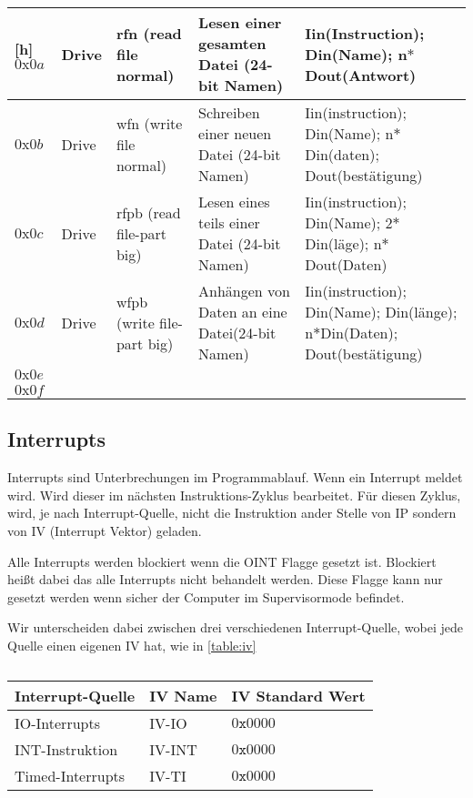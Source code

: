\documentclass{scrartcl}
\begin{document}
\begin{center}
\begin{longtable}{p{} | p{} | p{} | p{} | p{}}[h]
			\hline
			 $0\text{x}0a$ & Drive & rfn (read file normal) & Lesen einer gesamten Datei (24-bit Namen)  & Iin(Instruction); Din(Name); n$*$Dout(Antwort) \\
			\hline
			 $0\text{x}0b$ & Drive & wfn (write file normal) & Schreiben einer neuen Datei (24-bit Namen) & Iin(instruction); Din(Name); n$*$Din(daten); Dout(bestätigung) \\
			\hline
			 $0\text{x}0c$ & Drive & rfpb (read file-part big) & Lesen eines teils einer Datei (24-bit Namen) & Iin(instruction); Din(Name); 2$*$Din(läge); n$*$Dout(Daten) \\
			\hline
			 $0\text{x}0d$ & Drive & wfpb (write file-part big) & Anhängen von Daten an eine Datei(24-bit Namen) & Iin(instruction); Din(Name); Din(länge); n$*$Din(Daten); Dout(bestätigung) \\
			\hline
			 $0\text{x}0e$ &  & & & \\
			\hline
			 $0\text{x}0f$ &  & & &

	\end{longtable}
\end{center}

\subsection{\label{section:interrupts}Interrupts}

Interrupts sind Unterbrechungen im Programmablauf. Wenn ein Interrupt meldet wird. Wird dieser im nächsten Instruktions-Zyklus bearbeitet. Für diesen Zyklus, wird, je nach Interrupt-Quelle, nicht die Instruktion ander Stelle von IP sondern von IV (Interrupt Vektor) geladen.

Alle Interrupts werden blockiert wenn die OINT Flagge gesetzt ist. Blockiert heißt dabei das alle Interrupts nicht behandelt werden. Diese Flagge kann nur gesetzt werden wenn sicher der Computer im Supervisormode befindet.

Wir unterscheiden dabei zwischen drei verschiedenen Interrupt-Quelle, wobei jede Quelle einen eigenen IV hat, wie in \autoref{table:iv}

\begin{center}	
	\begin{table}[h]
		\caption{\label{table:iv}}
		\begin{tabular}{l | l l}
			Interrupt-Quelle & IV Name & IV Standard Wert \\
			\hline
			IO-Interrupts & IV-IO & $0\texttt{x}0000$ \\
			INT-Instruktion & IV-INT & $0\texttt{x}0000$ \\
			Timed-Interrupts & IV-TI & $0\texttt{x}0000$ \\
		\end{tabular}
	\end{table}
\end{center}
\end{document}
